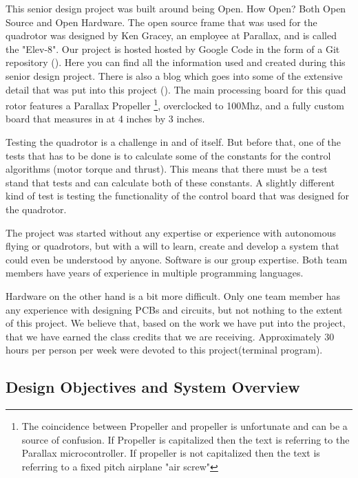 \documentclass{article}
\numberwithin{equation}{section} %
\begin{document}
This senior design project was built around being Open. How Open? Both Open Source and Open Hardware. The open source frame that was used for the quadrotor was designed by Ken Gracey, an employee at Parallax, and is called the "Elev-8". Our project is hosted hosted by Google Code in the form of a Git repository (\cite{anzhelka_code}). Here you can find all the information used and created during this senior design project. There is also a blog which goes into some of the extensive detail that was put into this project (\cite{anzhelka_blog}). The main processing board for this quad rotor features a Parallax Propeller \footnote{The coincidence between Propeller and propeller is unfortunate and can be a source of confusion. If Propeller is capitalized then the text is referring to the Parallax microcontroller. If propeller is not capitalized then the text is referring to a fixed pitch airplane "air screw"}, overclocked to 100Mhz, and a fully custom board that measures in at 4 inches by 3 inches.

Testing the quadrotor is a challenge in and of itself. But before that, one of the tests that has to be done is to calculate some of the constants for the control algorithms (motor torque and thrust). This means that there must be a test stand that tests and can calculate both of these constants. A slightly different kind of test is testing the functionality of the control board that was designed for the quadrotor.

The project was started without any expertise or experience with autonomous flying or quadrotors, but with a will to learn, create and develop a system that could even be understood by anyone. Software is our group expertise. Both team members have years of experience in multiple programming languages. 

Hardware on the other hand is a bit more difficult. Only one team member has any experience with designing PCBs and circuits, but not nothing to the extent of this project. We believe that, based on the work we have put into the project, that we have earned the class credits that we are receiving. Approximately 30 hours per person per week were devoted to this project(terminal program).

\subsection{Design Objectives and System Overview}
\end{document}
